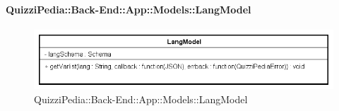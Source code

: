 \paragraph{QuizziPedia::Back-End::App::Models::LangModel}
\label{QuizziPedia::Back-End::App::Models::LangModel}
\begin{figure}[ht]
	\centering
	\includegraphics[scale=0.45]{UML/Classi/Back-End/QuizziPedia_Back-End_App_Models_langModel.png}
	\caption{QuizziPedia::Back-End::App::Models::LangModel}
\end{figure}
\FloatBarrier
